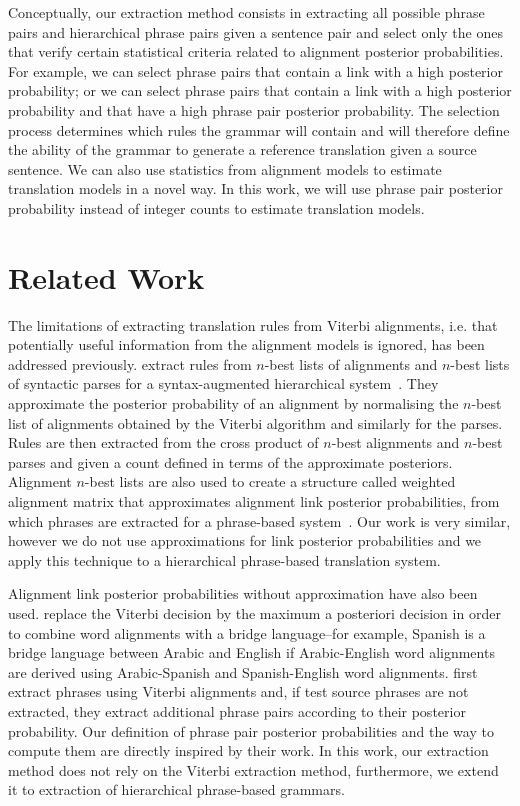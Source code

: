 Conceptually, our extraction method consists in extracting all possible phrase
pairs and hierarchical phrase pairs given a sentence pair and select only the
ones that verify certain statistical criteria related to alignment posterior
probabilities. For example, we can select phrase pairs that contain a link with
a high posterior probability; or we can select phrase pairs that contain a link
with a high posterior probability and that have a high phrase pair posterior
probability. The selection process determines which rules the grammar will
contain and will therefore define the ability of the grammar to generate a
reference translation given a source sentence. We can also use statistics from
alignment models to estimate translation models in a novel way. In this work, we
will use phrase pair posterior probability instead of integer counts to estimate
translation models.

\section{Related Work}
\label{sec:extractionFromPosteriorRelated}

The limitations of extracting translation rules from Viterbi alignments, i.e.
that potentially useful information from the alignment models is ignored, has
been addressed previously. \citet{venugopal-zollmann-smith-vogel:2008:AMTA}
extract rules from
$n$-best lists of alignments and $n$-best lists of syntactic parses for a
syntax-augmented hierarchical system~\citep{zollmann-venugopal:2006:WMT}. They
approximate the posterior probability of an alignment by normalising the
$n$-best list of alignments obtained by the Viterbi algorithm and similarly for
the parses. Rules are then extracted from the cross product of $n$-best
alignments and $n$-best parses and given a count defined in terms of the
approximate posteriors. Alignment $n$-best lists are also used to create a
structure called weighted alignment matrix that approximates alignment link
posterior probabilities, from which phrases are extracted for a phrase-based
system~\citep{liu-xia-xiao-liu:2009:EMNLP}. Our work is very similar, however we
do not use approximations for link posterior probabilities and we apply this
technique to a hierarchical phrase-based translation system.

Alignment link posterior probabilities without approximation have also been
used. \citet{kumar-och-macherey:2007:EMNLP} replace the Viterbi
decision by the maximum a posteriori decision in order to combine word
alignments with a bridge language--for example, Spanish is a bridge language
between Arabic and English if Arabic-English word alignments are derived using
Arabic-Spanish and Spanish-English word alignments.
\citet{deng-and-byrne:2008:ASLP} first extract phrases using Viterbi
alignments and, if test source phrases are not extracted, they extract
additional phrase pairs according to their posterior probability. Our definition
of phrase pair posterior probabilities and the way to compute them are directly
inspired by their work. In this work, our extraction method does not rely on the
Viterbi extraction method, furthermore, we extend it to extraction of
hierarchical phrase-based grammars.

